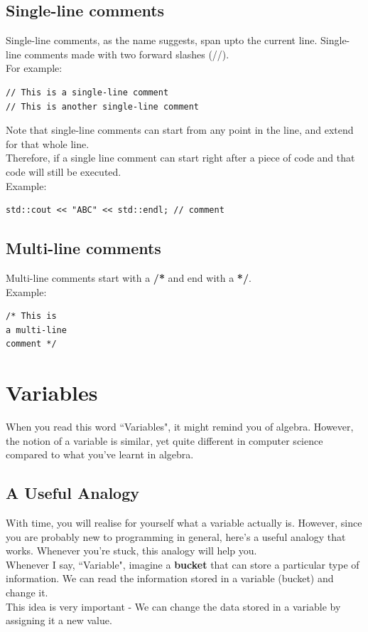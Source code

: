 \documentclass[letterpaper, 12pt]{book}
\begin{document}
\subsection{Single-line comments}
Single-line comments, as the name suggests, span upto the current line. Single-line comments made with two forward slashes (//).\\
For example:
\begin{lstlisting}
// This is a single-line comment
// This is another single-line comment
\end{lstlisting}
Note that single-line comments can start from any point in the line, and extend for that whole line.\\
Therefore, if a single line comment can start right after a piece of code and that code will still be executed.\\
Example:
\begin{lstlisting}
std::cout << "ABC" << std::endl; // comment 
\end{lstlisting}
\subsection{Multi-line comments}
Multi-line comments start with a \textbf{/*} and end with a \textbf{*/}.\\
Example:
\begin{lstlisting}
/* This is
a multi-line
comment */
\end{lstlisting}
\section{Variables}
When you read this word ``Variables", it might remind you of algebra. However, the notion of a variable is similar, yet quite different in computer science compared to what you've learnt in algebra.\\
\subsection{A Useful Analogy}
With time, you will realise for yourself what a variable actually is. However, since you are probably new to programming in general, here's a useful analogy that works. Whenever you're stuck, this analogy will help you.\\
Whenever I say, ``Variable", imagine a \textbf{bucket} that can store a particular type of information. We can read the information stored in a variable (bucket) and change it.\\
This idea is very important - We can change the data stored in a variable by assigning it a new value.
\end{document}
